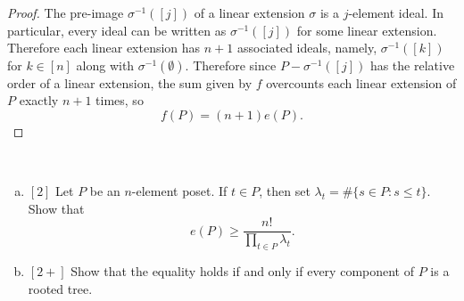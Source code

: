 \documentclass{article}
\newenvironment{problem}[2][Problem]{\begin{trivlist}
\item[\hskip \labelsep {\bfseries #1}\hskip \labelsep {\bfseries #2.}]}{\end{trivlist}}
\begin{document}
\begin{proof}
  The pre-image $\sigma^{-1}([j])$ of a linear extension $\sigma$ is a
  $j$-element ideal. In particular, every ideal can be written as
  $\sigma^{-1}([j])$ for some linear extension.
  Therefore each linear extension has $n+1$ associated ideals, namely,
  $\sigma^{-1}([k])$ for $k \in [n]$ along with $\sigma^{-1}(\emptyset)$.
  Therefore since $P - \sigma^{-1}([j])$ has the relative order of a linear
  extension, the sum given by $f$ overcounts each linear extension of $P$
  exactly $n + 1$ times, so
  \[
    f(P) = (n + 1)e(P).
  \]
\end{proof}
\pagebreak
\begin{problem}{57} ~
  \begin{enumerate}[a.]
    \item $[2]$ Let $P$ be an $n$-element poset. If $t \in P$, then set
    $\lambda_t = \#\{s \in P : s \leq t\}$.
    Show that \[
      e(P) \geq \frac{n!}{ \prod_{t \in P} \lambda_t}.
    \]
    \item $[2+]$ Show that the equality holds if and only if every component of $P$ is
    a rooted tree.
  \end{enumerate}
\end{problem}
\end{document}
